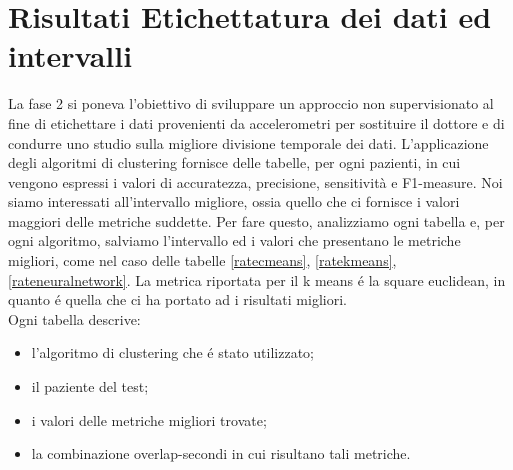 \section{Risultati Etichettatura dei dati ed intervalli}
La fase 2 si poneva l'obiettivo di sviluppare un approccio non supervisionato al fine di etichettare i dati provenienti da accelerometri per sostituire il dottore e di condurre uno studio sulla migliore divisione temporale dei dati. L'applicazione degli algoritmi di clustering fornisce delle tabelle, per ogni pazienti, in cui vengono espressi i valori di accuratezza, precisione, sensitività e F1-measure. Noi siamo interessati all'intervallo migliore, ossia quello che ci fornisce i valori maggiori delle metriche suddette. Per fare questo, analizziamo ogni tabella e, per ogni algoritmo, salviamo l'intervallo ed i valori che presentano le metriche migliori, come nel caso delle tabelle \ref{ratecmeans}, \ref{ratekmeans}, \ref{rateneuralnetwork}. La metrica riportata per il k means é la square euclidean, in quanto é quella che ci ha portato ad i risultati migliori. \\
Ogni tabella descrive:
\begin{itemize}
	\item l'algoritmo di clustering che é stato utilizzato;
	\item il paziente del test;
	\item i valori delle metriche migliori trovate;
	\item la combinazione overlap-secondi in cui risultano tali metriche.
\end{itemize}

